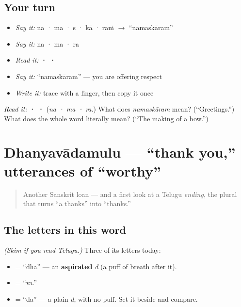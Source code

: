 \subsection*{Your turn}
\begin{itemize}
\raggedright
  \item \emph{Say it:} na · ma · s · kā · raṁ $\to$ \textquotedblleft{}namaskāram\textquotedblright{}
  \item \emph{Say it:} na · ma · ra
  \item \emph{Read it:} \textbf{ ·  · }
  \item \emph{Say it:} \textquotedblleft{}namaskāram\textquotedblright{} — you are offering respect
  \item \emph{Write it:} trace \textbf{} with a finger, then copy it once
\end{itemize}

\begin{tcolorbox}[breakable,colback=teal!4,colframe=teal!35!black,title={Before you move on}]
\emph{Read it:} \textbf{ ·  · } (\emph{na · ma · ra}.) What does \emph{namaskāram} mean? (“Greetings.”) What does the whole word literally mean? (“The making of a bow.”)
\end{tcolorbox}
\section[\texorpdfstring{\te{ధన్యవాదములు} (dhanyavādamulu)}{ధన్యవాదములు (dhanyavādamulu)}]{Dhanyavādamulu — \textquotedblleft{}thank you,\textquotedblright{} utterances of \textquotedblleft{}worthy\textquotedblright{}}

\label{lesson:TE-C01-dhanyavadamulu}



\begin{quote}
Another Sanskrit loan — and a first look at a Telugu \emph{ending}, the plural that turns \textquotedblleft{}a thanks\textquotedblright{} into \textquotedblleft{}thanks.\textquotedblright{}
\end{quote}

\subsection*{The letters in this word}
\emph{(Skim if you read Telugu.)} Three of its letters today:

\begin{itemize}
\raggedright
  \item \textbf{} = \textquotedblleft{}dha\textquotedblright{} — an \textbf{aspirated} \emph{d} (a puff of breath after it).
  \item \textbf{} = \textquotedblleft{}va.\textquotedblright{}
  \item \textbf{} = \textquotedblleft{}da\textquotedblright{} — a plain \emph{d}, with no puff. Set it beside \textbf{} and compare.
\end{itemize}

